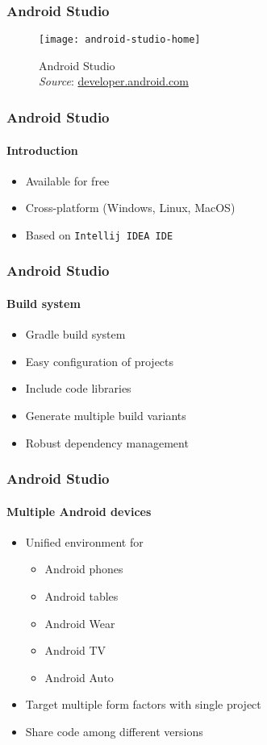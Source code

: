%
%


\begin{frame}[plain]
  \frametitle{Android Studio}

  \begin{figure}
    \centering
    \texttt{[image: android-studio-home]}
    \caption{Android Studio \\
      \emph{Source}: \url{developer.android.com}}
    \label{fig:android-studio-home}
  \end{figure}
  
\end{frame}

\begin{frame}
  \frametitle{Android Studio}
  \framesubtitle{Introduction}

  \begin{itemize}
  \item<1-> Available for free
  \item<2-> Cross-platform (Windows, Linux, MacOS)
  \item<3-> Based on \texttt{Intellij IDEA IDE}
  \end{itemize}

\end{frame}


\begin{frame}
  \frametitle{Android Studio}
  \framesubtitle{Build system}

  \begin{itemize}
  \item<1-> Gradle build system
  \item<2-> Easy configuration of projects
  \item<3-> Include code libraries
  \item<4-> Generate multiple build variants
  \item<5-> Robust dependency management
  \end{itemize}

\end{frame}


\begin{frame}
  \frametitle{Android Studio}
  \framesubtitle{Multiple Android devices}

  \begin{itemize}
  \item<1-> Unified environment for
    \begin{itemize}
    \item<2-> Android phones
    \item<3-> Android tables
    \item<4-> Android Wear
    \item<5-> Android TV
    \item<6-> Android Auto
    \end{itemize}
  \item<7-> Target multiple form factors with single project
  \item<8-> Share code among different versions
  \end{itemize}

\end{frame}

